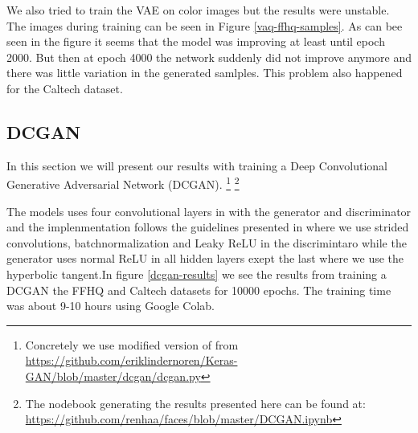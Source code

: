 We also tried to train the VAE on color images but the results were unstable. The images during training can be seen in Figure \ref{vaq-ffhq-samples}. As can bee seen in the figure it seems that the model was improving at least until epoch 2000. But then at epoch 4000 the network suddenly did not improve anymore and there was little variation in the generated samlples. This problem also happened for the Caltech dataset. 



\subsection{DCGAN}
In this section we will present our results with training a Deep Convolutional Generative Adversarial Network (DCGAN). \footnote{Concretely we use modified version of from \url{https://github.com/eriklindernoren/Keras-GAN/blob/master/dcgan/dcgan.py}} \footnote{The nodebook generating the results presented here can be found at: \url{https://github.com/renhaa/faces/blob/master/DCGAN.ipynb}}

The models uses four convolutional layers in with the generator and discriminator and the implenmentation follows the guidelines presented in \cite{dcgan} where we use strided convolutions, batchnormalization and Leaky ReLU in the discrimintaro while the generator uses normal ReLU in all hidden layers exept the last where we use the hyperbolic tangent.In figure \ref{dcgan-results} we see the results from training a DCGAN the FFHQ and Caltech datasets for 10000 epochs. The training time was about 9-10 hours  using Google Colab.

